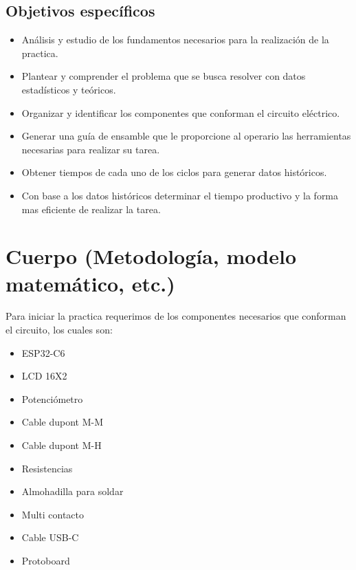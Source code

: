     \subsection{Objetivos específicos }
    \begin{itemize}
    \item Análisis y estudio de los fundamentos necesarios para la realización de la practica. 
        \item Plantear y comprender el problema que se busca resolver con datos estadísticos y teóricos. 
        \item Organizar y identificar los componentes que conforman el circuito eléctrico.
        \item Generar una guía de ensamble que le proporcione al operario las herramientas necesarias para realizar su tarea.
        \item Obtener tiempos de cada uno de los ciclos para generar datos históricos.
        \item Con base a los datos históricos determinar el tiempo productivo y la forma mas eficiente de realizar la tarea. 
    \end{itemize}
    
    \section{Cuerpo (Metodología, modelo matemático, etc.)}
    Para iniciar la practica requerimos de los componentes necesarios que conforman el circuito, los cuales son:
    \begin{itemize}
        \item ESP32-C6
        \item LCD 16X2
        \item Potenciómetro
        \item Cable dupont M-M
        \item Cable dupont M-H
        \item Resistencias
        \item Almohadilla para soldar
        \item Multi contacto
        \item Cable USB-C
        \item Protoboard 
    \end{itemize}
    
